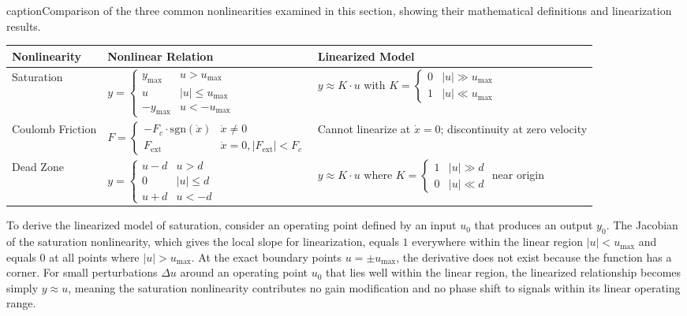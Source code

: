 \begin{table}[htbp]
\centering
\captionsetup{font=small}
caption{Comparison of the three common nonlinearities examined in this section, showing their mathematical definitions and linearization results.}
\label{tab:nonlinearity_comparison}
\begin{tabular}{|p{2.8cm}|p{3.8cm}|p{4.2cm}|}
\hline
\textbf{Nonlinearity} & \textbf{Nonlinear Relation} & \textbf{Linearized Model} \\
\hline
Saturation & $y = \begin{cases} y_{\max} & u > u_{\max} \\ u & |u| \leq u_{\max} \\ -y_{\max} & u < -u_{\max} \end{cases}$ & $y \approx K \cdot u$ with $K = \begin{cases} 0 & |u| \gg u_{\max} \\ 1 & |u| \ll u_{\max} \end{cases}$ \\
\hline
Coulomb Friction & $F = \begin{cases} -F_c \cdot \text{sgn}(\dot{x}) & \dot{x} \neq 0 \\ F_{\text{ext}} & \dot{x} = 0, |F_{\text{ext}}| < F_c \end{cases}$ & \makecell{Cannot linearize at $\dot{x}=0$;\\discontinuity at zero velocity} \\
\hline
Dead Zone & $y = \begin{cases} u - d & u > d \\ 0 & |u| \leq d \\ u + d & u < -d \end{cases}$ & $y \approx K \cdot u$ where $K = \begin{cases} 1 & |u| \gg d \\ 0 & |u| \ll d \end{cases}$ near origin \\
\hline
\end{tabular}
\end{table}

To derive the linearized model of saturation, consider an operating point defined by an input $u_0$ that produces an output $y_0$. The Jacobian of the saturation nonlinearity, which gives the local slope for linearization, equals $1$ everywhere within the linear region $|u| < u_{\max}$ and equals $0$ at all points where $|u| > u_{\max}$. At the exact boundary points $u = \pm u_{\max}$, the derivative does not exist because the function has a corner. For small perturbations $\Delta u$ around an operating point $u_0$ that lies well within the linear region, the linearized relationship becomes simply $y \approx u$, meaning the saturation nonlinearity contributes no gain modification and no phase shift to signals within its linear operating range.

